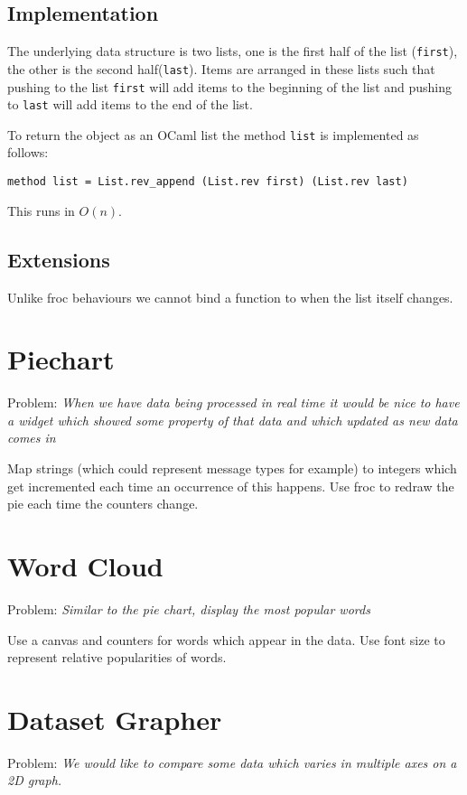 \subsection{Implementation}

The underlying data structure is two lists, one is the first half of the list (\texttt{first}), the other is the second half(\texttt{last}). Items are arranged in these lists such that pushing to the list \texttt{first} will add items to the beginning of the list and pushing to \texttt{last} will add items to the end of the list.

To return the object as an OCaml list the method \texttt{list} is implemented as follows:

\texttt{method list = List.rev\_append (List.rev first) (List.rev last)}

This runs in \texttt{$O(n)$}.

\subsection{Extensions}
Unlike froc behaviours we cannot bind a function to when the list itself changes.

\section{Piechart}
Problem: \emph{When we have data being processed in real time it would be nice to have a widget which showed some property of that data and which updated as new data comes in}

Map strings (which could represent message types for example) to integers which get incremented each time an occurrence of this happens. Use froc to redraw the pie each time the counters change.

\section{Word Cloud}
Problem: \emph{Similar to the pie chart, display the most popular words}

Use a canvas and counters for words which appear in the data. Use font size to represent relative popularities of words.

\section{Dataset Grapher}
Problem: \emph{We would like to compare some data which varies in multiple axes on a 2D graph.}

